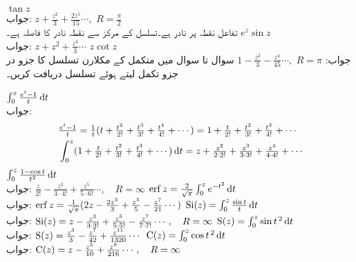 \quad
$\tan z$\\
جواب:\quad
$z+\tfrac{z^2}{3}+\tfrac{2z^5}{15}\cdots,\,\, R=\tfrac{\pi}{2}$\\
تفاعل  نقطہ  پر نادر ہے۔تسلسل کے مرکز  سے نقطہ نادر کا فاصلہ  ہے۔
\quad
$e^z\sin z$\\
جواب:\quad
$z+z^2+\tfrac{z^3}{3}\cdots$
\quad
$z\cot z$\\
جواب:\quad
$1-\tfrac{z^2}{3}-\tfrac{z^4}{45}\cdots,\,\,R=\pi$
سوال  تا سوال  میں متکمل کے مکلارن تسلسل کا جزو در جزو تکمل لیتے ہوئے تسلسل دریافت کریں۔

\quad
$\int_0^z \tfrac{e^t-1}{t}\dif t$\\
جواب:\quad 
\begin{align*}
&\tfrac{e^t-1}{t}=\tfrac{1}{t}(t+\tfrac{t^2}{2!}+\tfrac{t^3}{3!}+\tfrac{t^4}{4!}+\cdots)=1+\tfrac{t}{2!}+\tfrac{t^2}{3!}+\tfrac{t^3}{4!}+\cdots\\
&\int_0^z(1+\tfrac{t}{2!}+\tfrac{t^2}{3!}+\tfrac{t^3}{4!}+\cdots)\dif t=z+\tfrac{z^2}{2\cdot 2!}+\tfrac{z^3}{3\cdot 3!}+\tfrac{z^4}{4\cdot 4!}+\cdots
\end{align*}
\quad
$\int_0^z \tfrac{1-\cos t}{t^2}\dif t$\\
جواب:\quad
$\tfrac{z}{2!}-\tfrac{z^3}{3\cdot 4!}+\tfrac{z^5}{5\cdot 6!}\cdots,\quad R=\infty$
\quad
$\erf z=\tfrac{2}{\sqrt{\pi}}\int_0^z e^{-t^2}\dif t$\\
جواب:\quad
$\operatorname{erf} z=\tfrac{1}{\sqrt{\pi}}(2z-\tfrac{2z^3}{3}+\tfrac{z^5}{5}-\tfrac{z^7}{21}\cdots)$
\quad
$\kSi(z)=\int_0^z \tfrac{\sin t}{t}\dif t$\\
جواب:\quad
$\operatorname{Si}(z)=z-\tfrac{z^3}{3\cdot 3!}+\tfrac{z^5}{5\cdot 5!}-\tfrac{z^7}{7\cdot 7!}\cdots,\quad R=\infty$
\quad
$\kS(z)=\int_0^z \sin t^{\,2} \dif t$\\
جواب:\quad
$\operatorname{S}(z)=\tfrac{z^3}{3}-\tfrac{z^7}{42}+\tfrac{z^{11}}{1320}\cdots$
\quad
$\kC(z)=\int_0^z \cos t^{\,2}\dif t$\\
جواب:\quad
$\operatorname{C}(z)=z-\tfrac{z^5}{10}+\tfrac{z^9}{216}\cdots,\quad R=\infty$

